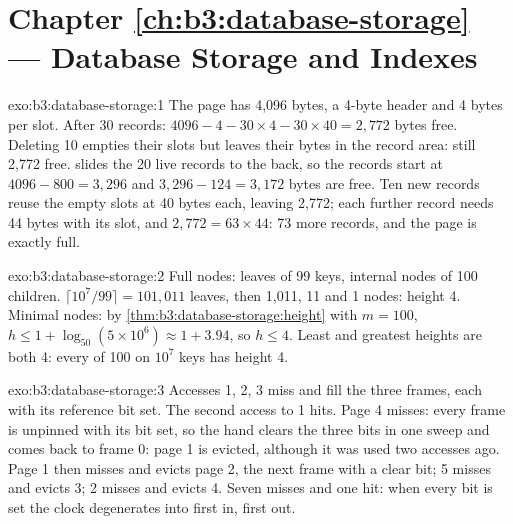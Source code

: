 \section*{Chapter \ref{ch:b3:database-storage} --- Database Storage and Indexes}

\begin{solution}{exo:b3:database-storage:1}
The page has 4,096 bytes, a 4-byte header and 4 bytes per slot. After 30 records: $4096 - 4 - 30 \times 4 - 30 \times 40 = 2{,}772$ bytes free. Deleting 10 empties their slots but leaves their bytes in the record area: still 2,772 free.  slides the 20 live records to the back, so the records start at $4096 - 800 = 3{,}296$ and $3{,}296 - 124 = 3{,}172$ bytes are free. Ten new records reuse the empty slots at 40 bytes each, leaving 2,772; each further record needs 44 bytes with its slot, and $2{,}772 = 63 \times 44$: 73 more records, and the page is exactly full.
\end{solution}

\begin{solution}{exo:b3:database-storage:2}
Full nodes: leaves of 99 keys, internal nodes of 100 children. $\lceil 10^7/99 \rceil = 101{,}011$ leaves, then 1,011, 11 and 1 nodes: height 4. Minimal nodes: by \cref{thm:b3:database-storage:height} with $m = 100$, $h \le 1 + \log_{50}(5 \times 10^6) \approx 1 + 3.94$, so $h \le 4$. Least and greatest heights are both 4: every  of  100 on $10^7$ keys has height 4.
\end{solution}

\begin{solution}{exo:b3:database-storage:3}
Accesses 1, 2, 3 miss and fill the three frames, each with its reference bit set. The second access to 1 hits. Page 4 misses: every frame is unpinned with its bit set, so the hand clears the three bits in one sweep and comes back to frame 0: page 1 is evicted, although it was used two accesses ago. Page 1 then misses and evicts page 2, the next frame with a clear bit; 5 misses and evicts 3; 2 misses and evicts 4. Seven misses and one hit: when every bit is set the clock degenerates into first in, first out.
\end{solution}

